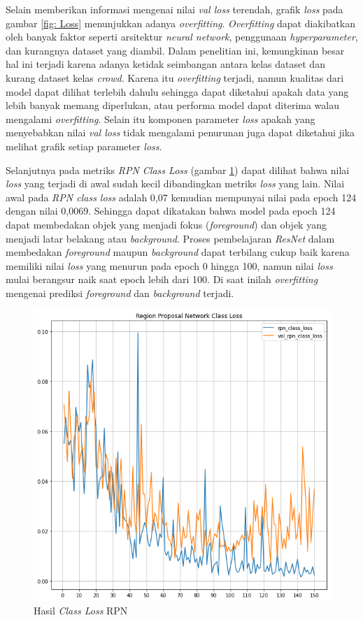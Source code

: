 Selain memberikan informasi mengenai nilai \textit{val loss} terendah, grafik \textit{loss} pada gambar \ref{fig: Loss} menunjukkan adanya \textit{overfitting}. \textit{Overfitting}
dapat diakibatkan oleh banyak faktor seperti arsitektur \textit{neural network}, penggunaan \textit{hyperparameter},
dan kurangnya dataset yang diambil. Dalam penelitian ini, kemungkinan besar hal ini terjadi karena adanya
ketidak seimbangan antara kelas dataset dan kurang dataset kelas \textit{crowd}. Karena itu \textit{overfitting}
terjadi, namun kualitas dari model dapat dilihat terlebih dahulu sehingga dapat diketahui apakah data
yang lebih banyak memang diperlukan, atau performa model dapat diterima walau mengalami \textit{overfitting}.
Selain itu komponen parameter \textit{loss} apakah yang menyebabkan nilai \textit{val loss} tidak mengalami penurunan
juga dapat diketahui jika melihat grafik setiap parameter \textit{loss}.

Selanjutnya pada metriks \textit{RPN Class Loss} (gambar \ref{fig: RPN Class Loss}) dapat dilihat bahwa
nilai \textit{loss} yang terjadi di awal sudah kecil dibandingkan metriks \textit{loss} yang lain. Nilai
awal pada \textit{RPN class loss} adalah 0,07 kemudian mempunyai nilai pada epoch 124 dengan nilai 0,0069.
Sehingga dapat dikatakan bahwa model pada epoch 124 dapat membedakan objek yang menjadi fokus (\textit{foreground})
dan objek yang menjadi latar belakang atau \textit{background}. Proses pembelajaran \textit{ResNet} dalam
membedakan \textit{foreground} maupun \textit{background} dapat terbilang cukup baik karena memiliki
nilai \textit{loss} yang menurun pada epoch 0 hingga 100, namun nilai \textit{loss} mulai berangsur naik
saat epoch lebih dari 100. Di saat inilah \textit{overfitting} mengenai prediksi \textit{foreground} dan
\textit{background} terjadi.

\begin{figure}[h!]
  \begin{center}
    \includegraphics[width= 0.55\linewidth]{bab4/5. RPN_Class_Loss.png}
    \caption{Hasil \textit{Class Loss} RPN}
    \label{fig: RPN Class Loss}
  \end{center}
\end{figure}

